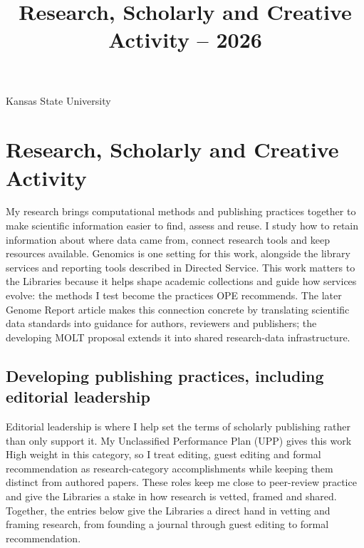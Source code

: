 \title{Research, Scholarly and Creative Activity -- 2026}
\address{University Library}{Kansas State University}
\portfoliotitle

\begingroup
\setlength{\parindent}{1.5em}
\setlength{\parskip}{0.45em}

\section{Research, Scholarly and Creative Activity}
My research brings computational methods and publishing practices together to make scientific information easier to find, assess and reuse. I study how to retain information about where data came from, connect research tools and keep resources available. Genomics is one setting for this work, alongside the library services and reporting tools described in Directed Service. This work matters to the Libraries because it helps shape academic collections and guide how services evolve: the methods I test become the practices OPE recommends. The later Genome Report article makes this connection concrete by translating scientific data standards into guidance for authors, reviewers and publishers; the developing MOLT proposal extends it into shared research-data infrastructure.

\subsection{Developing publishing practices, including editorial leadership}
Editorial leadership is where I help set the terms of scholarly publishing rather than only support it. My Unclassified Performance Plan (UPP) gives this work High weight in this category, so I treat editing, guest editing and formal recommendation as research-category accomplishments while keeping them distinct from authored papers. These roles keep me close to peer-review practice and give the Libraries a stake in how research is vetted, framed and shared. Together, the entries below give the Libraries a direct hand in vetting and framing research, from founding a journal through guest editing to formal recommendation.


